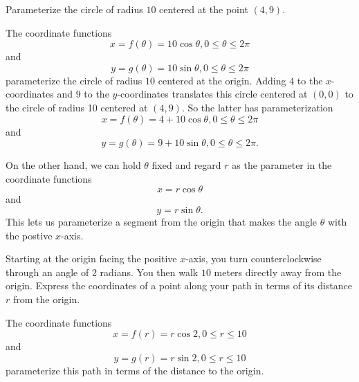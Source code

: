 \documentclass{ximera}
\begin{document}
\begin{example} \label{Ex10:Cosine}
Parameterize the circle of radius $10$ centered at the point $(4,9)$.

\begin{explanation}
The coordinate functions
\[
     x = f(\theta) = 10\cos \theta   , 0\leq \theta \leq 2\pi
\]
and
\[
  y =g(\theta) = 10\sin \theta   , 0\leq \theta \leq 2\pi
\]
parameterize the circle of radius $10$ centered at the origin. Adding $4$ to the $x$-coordinates and $9$ to the $y$-coordinates translates this circle centered at $(0,0)$ to the circle of radius 10 centered at $(4,9)$. So the latter has parameterization
\[
     x = f(\theta) = 4+ 10\cos \theta   , 0\leq \theta \leq 2\pi
\]
and
\[
  y = g(\theta) = 9 + 10\sin \theta   , 0\leq \theta \leq 2\pi .
\]
\end{explanation}
\end{example}

On the other hand, we can hold $\theta$ fixed and regard $r$ as the parameter in the coordinate functions
\[
    x = r \cos \theta 
\]
and
\[
      y=r\sin \theta .
\]
This lets us parameterize a segment from the origin that makes the angle $\theta$ with the postive $x$-axis.

\begin{example} \label{Ex11:Cosine}
Starting at the origin facing the positive $x$-axis, you turn counterclockwise through an angle of 2 radians. You then walk $10$ meters directly away from the origin. Express the coordinates of a point along your path in terms of its distance $r$ from the origin.

\begin{explanation}
The coordinate functions
\[
     x = f(r) = r\cos 2   , 0\leq r \leq 10
\]
and
\[
  y =g(r) = r \sin 2   , 0\leq r \leq 10
\]
parameterize this path in terms of the distance to the origin.
\end{explanation}
\end{example}
\end{document}
